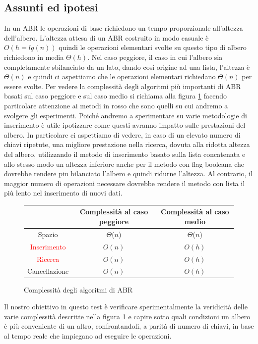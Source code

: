 \subsection{Assunti ed ipotesi}
\label{sec:AssuntiEdIpotesi_1}
In un ABR le operazioni di base richiedono un tempo proporzionale all'altezza dell'albero. L'altezza attesa di un ABR costruito in modo casuale è $O(h = lg(n))$ quindi
le operazioni elementari svolte su questo tipo di albero richiedono in media $\Theta(h)$. Nel caso peggiore, il caso in cui l'albero sia completamente sbilanciato 
da un lato, dando cosi origine ad una lista, l'altezza è $\Theta(n)$ e quindi ci aspettiamo che le operazioni elementari richiedano $\Theta(n)$ per essere svolte.
Per vedere la complessità degli algoritmi più importanti di ABR basati sul caso peggiore e sul caso medio si richiama alla figura \ref{fig:ComplessitàABR} facendo
particolare attenzione ai metodi in rosso che sono quelli su cui andremo a svolgere gli esperimenti.
Poiché andremo a sperimentare su varie metodologie di inserimento è utile ipotizzare come questi avranno impatto sulle prestazioni del albero. In particolare
ci aspettiamo di vedere, in caso di un elevato numero di chiavi ripetute, una migliore prestazione nella ricerca, dovuta alla ridotta altezza del albero, utilizzando il metodo
di inserimento basato sulla lista concatenata e allo stesso modo un altezza inferiore anche per il metodo con flag booleana che dovrebbe rendere piu bilanciato l'albero 
e quindi ridurne l'altezza. 
Al contrario, il maggior numero di operazioni necessare dovrebbe rendere il metodo con lista il più lento nel inserimento di nuovi dati.

\begin{figure}[H]
    \centering
    \begin{tabular}{|c|c|c|}
        \hline
         & Complessità al caso peggiore & Complessità al caso medio\\
        \hline
        Spazio & $\Theta$($n$) & $\Theta$($n$)\\
        \hline
        \textcolor{red}{Inserimento} & $O(n)$ & $O(h)$\\
        \hline
        \textcolor{red}{Ricerca} & $O(n)$ & $O(h)$\\
        \hline
        Cancellazione & $O(n)$ & $O(h)$\\
        \hline
    \end{tabular}
    \caption{Complessità degli algoritmi di ABR}
    \label{fig:ComplessitàABR}
\end{figure}
Il nostro obiettivo in questo test è verificare sperimentalmente la veridicità delle varie complessità descritte nella figura \ref{fig:ComplessitàABR} e capire
sotto quali condizioni un albero è più conveniente di un altro, confrontandoli, a parità di numero di chiavi, in base al tempo reale che impiegano ad eseguire le operazioni.

